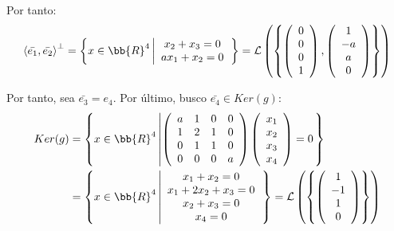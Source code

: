\begin{ejercicio}
\begin{enumerate}
        Por tanto:
        \begin{equation*}
            \left<\bar{e_1},\bar{e_2}\right>^\perp = \left\{x\in \bb{R}^4 \left|
            \begin{array}{c}
                x_2 +x_3= 0 \\
                ax_1 + x_2 = 0 \\
            \end{array}
            \right.\right\}
            = \mathcal{L} \left( \left\{
            \left( \begin{array}{c}
                0 \\ 0 \\ 0 \\ 1
            \end{array} \right),
            \left( \begin{array}{c}
                1 \\ -a \\ a \\ 0
            \end{array} \right)
            \right\}\right)
        \end{equation*}

        Por tanto, sea $\bar{e_3} = e_4$. Por último, busco $\bar{e_4} \in Ker(g)$:
        \begin{equation*}\begin{split}
            Ker(g) & = \left\{x\in \bb{R}^4 \left|
            \left( \begin{array}{cccc}
                a & 1 & 0 & 0 \\
                1 & 2 & 1 & 0 \\
                0 & 1 & 1 & 0 \\
                0 & 0 & 0 & a
            \end{array}\right)
            \left( \begin{array}{c}
                x_1 \\ x_2 \\ x_3 \\ x_4
            \end{array}\right)
            = 0
            \right.\right\}\\
            &= \left\{x\in \bb{R}^4 \left|
            \begin{array}{c}
                x_1+x_2 = 0 \\
                x_1+2x_2+x_3 = 0\\
                x_2+x_3 = 0\\
                x_4=0
            \end{array}
            \right.\right\} = \mathcal{L} \left( \left\{
            \left( \begin{array}{c}
                1 \\ -1 \\ 1 \\ 0
            \end{array} \right)
            \right\}\right)
        \end{split}\end{equation*}


\end{enumerate}
\end{ejercicio}
